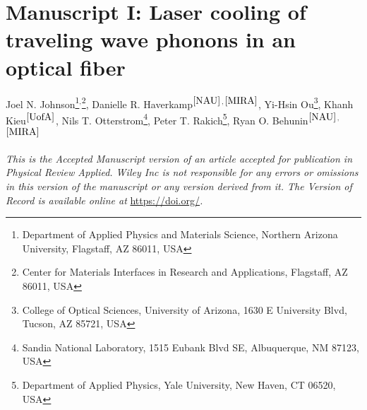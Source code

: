 \setcounter{rownumber}{0}
\singlespacing
\chapter{Manuscript I: Laser cooling of traveling wave phonons in an optical fiber}
\label{chap: 2-Cooling}
\acresetall



Joel N. Johnson\footnote{\label{NAU}
Department of Applied Physics and Materials Science, Northern Arizona University, Flagstaff, AZ 86011, USA
}$^,$\footnote{\label{MIRA}
Center for Materials Interfaces in Research and Applications, Flagstaff, AZ 86011, USA
},
Danielle R. Haverkamp$^\mathrm{\ref{NAU}}$$^,$$^\mathrm{\ref{MIRA}}$,
Yi-Hsin Ou\footnote{\label{UofA}
College of Optical Sciences, University of Arizona, 1630 E University Blvd, Tucson, AZ 85721, USA
},
Khanh Kieu$^\mathrm{\ref{UofA}}$,
Nils T. Otterstrom\footnote{\label{Sandia}
Sandia National Laboratory, 1515 Eubank Blvd SE, Albuquerque, NM 87123, USA
},
Peter T. Rakich\footnote{\label{Yale}
Department of Applied Physics, Yale University, New Haven, CT 06520, USA
},
Ryan O. Behunin$^\mathrm{\ref{NAU}}$$^,$$^\mathrm{\ref{MIRA}}$

\hfill


\textit{This is the Accepted Manuscript version of an article accepted for publication in Physical Review Applied. Wiley Inc is not responsible for any errors or omissions in this version of the manuscript or any version derived from it. The Version of Record is available online at} \url{https://doi.org/}\textit{.}

\doublespacing


